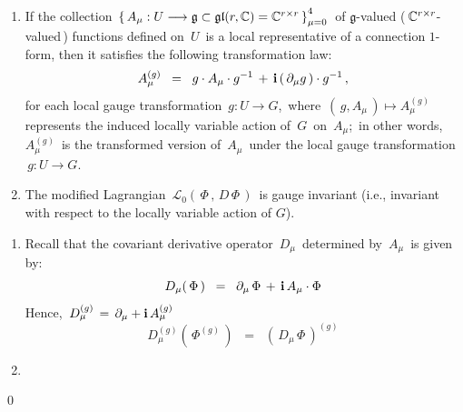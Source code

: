 \begin{proposition}
\begin{enumerate}
\item
    If the collection
    \,$
    \left\{\,
        A_{\mu} :
        U \longrightarrow \mathfrak{g} \subset \mathfrak{gl}(r,\mathbb{C}) = \mathbb{C}^{r \times r}
        \,\right\}_{\mu = 0}^{4}
    $\,
    of $\mathfrak{g}$-valued (\,$\mathbb{C}^{r \times r}$-valued\,) functions defined on \,$U$\,
    is a local representative of a connection $1$-form,
    then it satisfies the following transformation law:
    \begin{equation*}
    A_{\mu}^{(g)}
    \;\; = \;\;
        g \cdot A_{\mu} \cdot g^{-1}
        \,+\,
        \mathbf{i}\left(\,\partial_{\mu}g\,\right) \cdot g^{-1}\,,
    \end{equation*}
    for each local gauge transformation \,$g : U \longrightarrow G$,\,
    where \,$(\,g , A_{\mu}\,) \longmapsto A_{\mu}^{(g)}$\,
    represents the induced locally variable action of \,$G$\, on \,$A_{\mu}$;\,
    in other words,
    \,$A_{\mu}^{(g)}$\, is the transformed version of \,$A_{\mu}$\,
    under the local gauge transformation \,$g : U \longrightarrow G$.\,
\item
    The modified Lagrangian \,$\mathcal{L}_{0}\!\left(\,\Phi\,,\,D\,\Phi\,\right)$\,
    is gauge invariant (i.e., invariant with respect to the locally variable action of $G$).
\end{enumerate}
\end{proposition}
\proof
\begin{enumerate}
\item
    Recall that the covariant derivative operator \,$D_{\mu}$\, determined by \,$A_{\mu}$\,
    is given by:
    \begin{equation*}
    D_{\mu}\!\left(\,\Phi\,\right)
    \;\; = \;\;
        \partial_{\mu}\,\Phi
        \,+\,
        \mathbf{i}\,A_{\mu}\cdot\Phi
    \end{equation*}
    Hence,
    \,$D_{\mu}^{(g)} \,=\, \partial_{\mu} + \mathbf{i}\,A_{\mu}^{(g)}$\,
    \begin{equation*}
    D^{(g)}_{\mu}\!\left(\,\Phi^{(g)}\,\right)
    \;\; = \;\;
        \left(\,D_{\mu}\,\Phi\,\right)^{(g)}
    \end{equation*}
\item

\end{enumerate}
\qed

